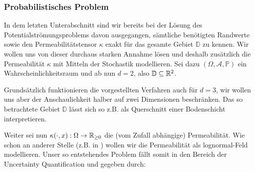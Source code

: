 \subsubsection{Probabilistisches Problem}
\label{Probabilistisches Problem}
In dem letzten Unterabschnitt sind wir bereits bei der Lösung des Potentialströmungsproblems davon ausgegangen, sämtliche benötigten Randwerte sowie den Permeabilitätstensor $\kappa$ exakt für das gesamte Gebiet $\mathbb{D}$ zu kennen.
Wir wollen uns von dieser durchaus starken Annahme lösen und deshalb zusätzlich die Permeabilität $\kappa$ mit Mitteln der Stochastik modellieren.
Sei dazu $(\Omega, \mathcal{A},\mathbb{P})$ ein Wahrscheinlichkeitsraum und ab nun $d=2$, also $\mathbb{D} \subseteq \mathbb{R}^2$.
\begin{Bemerkung}
	Grundsätzlich funktionieren die vorgestellten Verfahren auch für $d=3$, wir wollen uns aber der Anschaulichkeit halber auf zwei Dimensionen beschränken. Das so betrachtete Gebiet $\mathbb{D}$ lässt sich so z.B. als Querschnitt einer Bodenschicht interpretieren.
\end{Bemerkung} 
Weiter sei nun $\kappa (\cdot,x): \Omega \rightarrow \mathbb{R}_{\geq0}$ die (vom Zufall abhängige) Permeabilität.
Wie schon an anderer Stelle (z.B. in \cite{kumar2018multigrid}) wollen wir die Permeabilität als lognormal-Feld modellieren.
Unser so entstehendes Problem fällt somit in den Bereich der Uncertainty Quantification und gegeben durch: 


